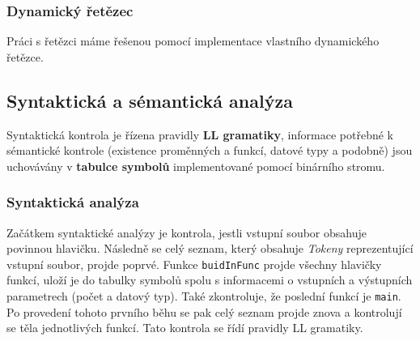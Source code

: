 \documentclass[czech,a4paper,12pt]{article}[]
\begin{document}
\begin{center}
\end{center}

\subsubsection{Dynamický řetězec}
Práci s řetězci máme řešenou pomocí implementace vlastního dynamického řetězce.

\newpage

\subsection{Syntaktická a sémantická analýza}
Syntaktická kontrola je řízena pravidly \textbf{LL gramatiky}, informace potřebné k sémantické kontrole (existence proměnných a funkcí, datové typy a podobně) jsou uchovávány v \textbf{tabulce symbolů} implementované pomocí binárního stromu. 


\subsubsection{Syntaktická analýza}
Začátkem syntaktické analýzy je kontrola, jestli vstupní soubor obsahuje povinnou hlavičku. Následně se celý seznam, který obsahuje \emph{Tokeny} reprezentující vstupní soubor, projde poprvé. Funkce \texttt{buidInFunc} projde všechny hlavičky funkcí, uloží je do tabulky symbolů spolu s informacemi o vstupních a výstupních parametrech (počet a datový typ). Také zkontroluje, že poslední funkcí je \texttt{main}. Po provedení tohoto prvního běhu se pak celý seznam projde znova a kontrolují se těla jednotlivých funkcí. Tato kontrola se řídí pravidly LL gramatiky.
\end{document}
